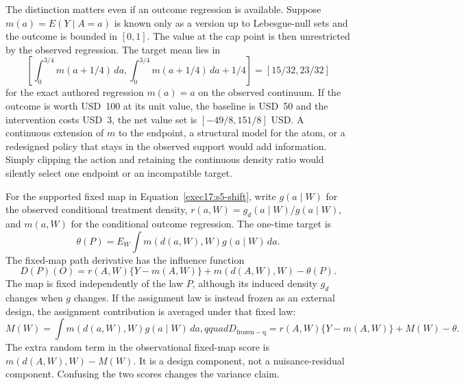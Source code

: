 The distinction matters even if an outcome regression is available. Suppose
$m(a)=E(Y\mid A=a)$ is known only as a version up to Lebesgue-null sets and
the outcome is bounded in $[0,1]$. The value at the cap point is then
unrestricted by the observed regression. The target mean lies in
\begin{equation}
 \left[\int_0^{3/4}m(a+1/4)\,da,
       \int_0^{3/4}m(a+1/4)\,da+1/4\right]
 = [15/32,23/32]
 \label{exec17:s5-cap-set}
 \end{equation}
for the exact authored regression $m(a)=a$ on the observed continuum. If the
outcome is worth USD~100 at its unit value, the baseline is USD~50 and the
intervention costs USD~3, the net value set is
$[-49/8,151/8]$ USD. A continuous extension of $m$ to the endpoint, a structural
model for the atom, or a redesigned policy that stays in the observed support
would add information. Simply clipping the action and retaining the continuous
density ratio would silently select one endpoint or an incompatible target.
\citep{lmtp2023,exec17_s5_math}

For the supported fixed map in Equation~\eqref{exec17:s5-shift}, write
$g(a\mid W)$ for the observed conditional treatment density,
$r(a,W)=g_d(a\mid W)/g(a\mid W)$, and $m(a,W)$ for the conditional outcome
regression. The one-time target is
\begin{equation}
 \theta(P)=E_W\int m(d(a,W),W)g(a\mid W)\,da.
 \label{exec17:s5-lmtp-target}
\end{equation}
The fixed-map path derivative has the influence function
\begin{equation}
 D(P)(O)=r(A,W)\{Y-m(A,W)\}+m(d(A,W),W)-\theta(P).
 \label{exec17:s5-lmtp-if}
\end{equation}
The map is fixed independently of the law $P$, although its induced density
$g_d$ changes when $g$ changes. If the assignment law is instead frozen as an
external design, the assignment contribution is averaged under that fixed law:
\begin{equation}
 M(W)=\int m(d(a,W),W)g(a\mid W)\,da,qquad
 D_{\mathrm{frozen-q}}=r(A,W)\{Y-m(A,W)\}+M(W)-\theta.
 \label{exec17:s5-frozen-if}
\end{equation}
The extra random term in the observational fixed-map score is
$m(d(A,W),W)-M(W)$. It is a design component, not a nuisance-residual
component. Confusing the two scores changes the variance claim.

